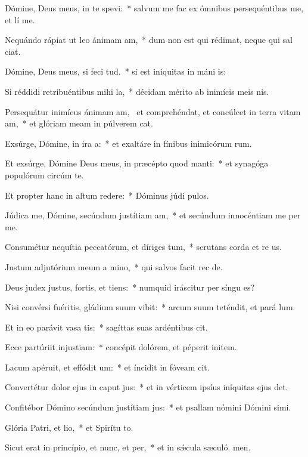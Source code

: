 \item Dómine, Deus meus, in te spevi:~* salvum me fac ex ómnibus persequéntibus me, et lí me.
\item Nequándo rápiat ut leo ánimam am,~* dum non est qui rédimat, neque qui sal ciat.
\item Dómine, Deus meus, si feci tud.~* si est iníquitas in máni is:
\item Si réddidi retribuéntibus mihi la,~* décidam mérito ab inimícis meis nis.
\item Persequátur inimícus ánimam am,~\pscross{} et comprehéndat, et concúlcet in terra vitam am,~* et glóriam meam in púlverem cat.
\item Exsúrge, Dómine, in ira a:~* et exaltáre in fínibus inimicórum rum.
\item Et exsúrge, Dómine Deus meus, in præcépto quod manti:~* et synagóga populórum circúm te.
\item Et propter hanc in altum redere:~* Dóminus júdi pulos.
\item Júdica me, Dómine, secúndum justítiam am,~* et secúndum innocéntiam me per me.
\item Consumétur nequítia peccatórum, et díriges tum,~* scrutans corda et re us.
\item Justum adjutórium meum a mino,~* qui salvos facit rec de.
\item Deus judex justus, fortis, et tiens:~* numquid iráscitur per síngu es?
\item Nisi convérsi fuéritis, gládium suum vibit:~* arcum suum teténdit, et pará lum.
\item Et in eo parávit vasa tis:~* sagíttas suas ardéntibus cit.
\item Ecce partúriit injustiam:~* concépit dolórem, et péperit initem.
\item Lacum apéruit, et effódit um:~* et íncidit in fóveam  cit.
\item Convertétur dolor ejus in caput jus:~* et in vérticem ipsíus iníquitas ejus det.
\item Confitébor Dómino secúndum justítiam jus:~* et psallam nómini Dómini simi.
\item Glória Patri, et lio,~* et Spirítu to.
\item Sicut erat in princípio, et nunc, et per,~* et in sǽcula sæculó. men.
